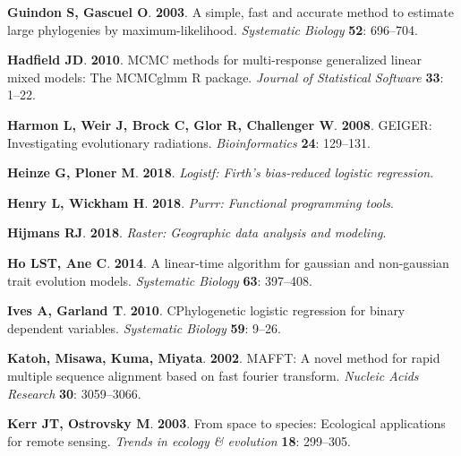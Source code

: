 \documentclass[man,floatsintext]{apa6}
\theoremstyle{definition}
\theoremstyle{definition}
\theoremstyle{definition}
\theoremstyle{remark}
\begin{document}
\leavevmode\hypertarget{ref-guindon2003a}{}%
\textbf{\textnormal{Guindon S}, \textnormal{Gascuel O}}. \textbf{2003}.
A simple, fast and accurate method to estimate large phylogenies by
maximum-likelihood. \emph{Systematic Biology} \textbf{52}: 696--704.

\leavevmode\hypertarget{ref-R-MCMCglmm}{}%
\textbf{\textnormal{Hadfield JD}}. \textbf{2010}. MCMC methods for
multi-response generalized linear mixed models: The MCMCglmm R package.
\emph{Journal of Statistical Software} \textbf{33}: 1--22.

\leavevmode\hypertarget{ref-R-geiger_d}{}%
\textbf{\textnormal{Harmon L}, \textnormal{Weir J}, \textnormal{Brock
C}, \textnormal{Glor R}, \textnormal{Challenger W}}. \textbf{2008}.
GEIGER: Investigating evolutionary radiations. \emph{Bioinformatics}
\textbf{24}: 129--131.

\leavevmode\hypertarget{ref-R-logistf}{}%
\textbf{\textnormal{Heinze G}, \textnormal{Ploner M}}. \textbf{2018}.
\emph{Logistf: Firth's bias-reduced logistic regression}.

\leavevmode\hypertarget{ref-R-purrr}{}%
\textbf{\textnormal{Henry L}, \textnormal{Wickham H}}. \textbf{2018}.
\emph{Purrr: Functional programming tools}.

\leavevmode\hypertarget{ref-R-raster}{}%
\textbf{\textnormal{Hijmans RJ}}. \textbf{2018}. \emph{Raster:
Geographic data analysis and modeling}.

\leavevmode\hypertarget{ref-R-phylolm}{}%
\textbf{\textnormal{Ho LST}, \textnormal{Ane C}}. \textbf{2014}. A
linear-time algorithm for gaussian and non-gaussian trait evolution
models. \emph{Systematic Biology} \textbf{63}: 397--408.

\leavevmode\hypertarget{ref-ives2010phylogenetic}{}%
\textbf{\textnormal{Ives A}, \textnormal{Garland T}}. \textbf{2010}.
CPhylogenetic logistic regression for binary dependent variables.
\emph{Systematic Biology} \textbf{59}: 9--26.

\leavevmode\hypertarget{ref-katoh2002mafft}{}%
\textbf{\textnormal{Katoh}, \textnormal{Misawa}, \textnormal{Kuma},
\textnormal{Miyata}}. \textbf{2002}. MAFFT: A novel method for rapid
multiple sequence alignment based on fast fourier transform.
\emph{Nucleic Acids Research} \textbf{30}: 3059--3066.

\leavevmode\hypertarget{ref-kerr2003space}{}%
\textbf{\textnormal{Kerr JT}, \textnormal{Ostrovsky M}}. \textbf{2003}.
From space to species: Ecological applications for remote sensing.
\emph{Trends in ecology \& evolution} \textbf{18}: 299--305.
\end{document}
